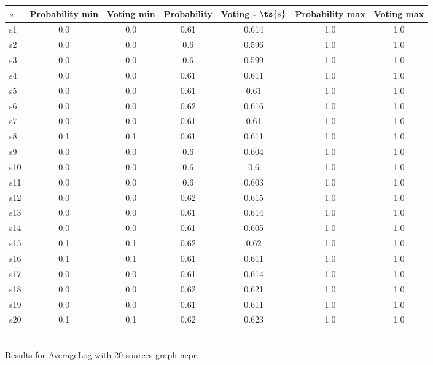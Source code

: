 \documentclass{article}
\begin{document}
\noindent\begin{tabular}{|l|c|c|c|c|c|c|}
\hline
$s$& Probability min & Voting min & Probability & Voting - $\ts{s}$ & Probability max & Voting max\\
\hline
s1 &0.0 & 0.0 & 0.61 & 0.614 & 1.0 & 1.0\\
\hline
s2 &0.0 & 0.0 & 0.6 & 0.596 & 1.0 & 1.0\\
\hline
s3 &0.0 & 0.0 & 0.6 & 0.599 & 1.0 & 1.0\\
\hline
s4 &0.0 & 0.0 & 0.61 & 0.611 & 1.0 & 1.0\\
\hline
s5 &0.0 & 0.0 & 0.61 & 0.61 & 1.0 & 1.0\\
\hline
s6 &0.0 & 0.0 & 0.62 & 0.616 & 1.0 & 1.0\\
\hline
s7 &0.0 & 0.0 & 0.61 & 0.61 & 1.0 & 1.0\\
\hline
s8 &0.1 & 0.1 & 0.61 & 0.611 & 1.0 & 1.0\\
\hline
s9 &0.0 & 0.0 & 0.6 & 0.604 & 1.0 & 1.0\\
\hline
s10 &0.0 & 0.0 & 0.6 & 0.6 & 1.0 & 1.0\\
\hline
s11 &0.0 & 0.0 & 0.6 & 0.603 & 1.0 & 1.0\\
\hline
s12 &0.0 & 0.0 & 0.62 & 0.615 & 1.0 & 1.0\\
\hline
s13 &0.0 & 0.0 & 0.61 & 0.614 & 1.0 & 1.0\\
\hline
s14 &0.0 & 0.0 & 0.61 & 0.605 & 1.0 & 1.0\\
\hline
s15 &0.1 & 0.1 & 0.62 & 0.62 & 1.0 & 1.0\\
\hline
s16 &0.1 & 0.1 & 0.61 & 0.611 & 1.0 & 1.0\\
\hline
s17 &0.0 & 0.0 & 0.61 & 0.614 & 1.0 & 1.0\\
\hline
s18 &0.0 & 0.0 & 0.62 & 0.621 & 1.0 & 1.0\\
\hline
s19 &0.0 & 0.0 & 0.61 & 0.611 & 1.0 & 1.0\\
\hline
s20 &0.1 & 0.1 & 0.62 & 0.623 & 1.0 & 1.0\\
\hline
\end{tabular}\\

\noindent Results for AverageLog with 20 sources graph ncpr.
\end{document}
